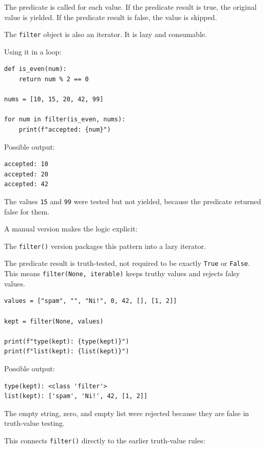 The predicate is called for each value. If the predicate result is true, the original value is yielded. If the predicate result is false, the value is skipped.



The \texttt{filter} object is also an iterator. It is lazy and consumable.

Using it in a loop:

\begin{verbatim}
def is_even(num):
    return num % 2 == 0

nums = [10, 15, 20, 42, 99]

for num in filter(is_even, nums):
    print(f"accepted: {num}")
\end{verbatim}

Possible output:

\begin{verbatim}
accepted: 10
accepted: 20
accepted: 42
\end{verbatim}

The values \texttt{15} and \texttt{99} were tested but not yielded, because the predicate returned false for them.

A manual version makes the logic explicit:



The \texttt{filter()} version packages this pattern into a lazy iterator.

The predicate result is truth-tested, not required to be exactly \texttt{True} or \texttt{False}. This means \texttt{filter(None, iterable)} keeps truthy values and rejects falsy values.

\begin{verbatim}
values = ["spam", "", "Ni!", 0, 42, [], [1, 2]]

kept = filter(None, values)

print(f"type(kept): {type(kept)}")
print(f"list(kept): {list(kept)}")
\end{verbatim}

Possible output:

\begin{verbatim}
type(kept): <class 'filter'>
list(kept): ['spam', 'Ni!', 42, [1, 2]]
\end{verbatim}

The empty string, zero, and empty list were rejected because they are false in truth-value testing.

This connects \texttt{filter()} directly to the earlier truth-value rules:

